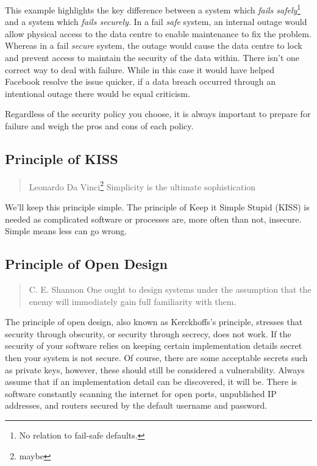 This example highlights the key difference between a system which \textsl{fails safely}\footnote{No relation to fail-safe defaults.} and a system which \textsl{fails securely}.
In a fail \textsl{safe} system, an internal outage would allow physical access to the data centre to enable maintenance to fix the problem.
Whereas in a fail \textsl{secure} system, the outage would cause the data centre to lock and prevent access to maintain the security of the data within.
There isn't one correct way to deal with failure.
While in this case it would have helped Facebook resolve the issue quicker,
if a data breach occurred through an intentional outage there would be equal criticism.

Regardless of the security policy you choose, it is always important to prepare for failure and weigh the pros and cons of each policy.

\subsection{Principle of KISS}

\begin{quote}{Leonardo Da Vinci\footnote{maybe}}
Simplicity is the ultimate sophistication
\end{quote}

\noindent We'll keep this principle simple.
The principle of Keep it Simple Stupid (KISS) is needed as complicated software or processes are, more often than not, insecure.
Simple means less can go wrong.

\subsection{Principle of Open Design}

\begin{quote}{C. E. Shannon \cite{shannons-maxim}}
One ought to design systems under the assumption that the enemy will immediately gain full familiarity with them.
\end{quote}

\noindent The principle of open design, also known as Kerckhoffs's principle,
stresses that security through obscurity, or security through secrecy, does not work.
If the security of your software relies on keeping certain implementation details secret then your system is not secure.
Of course, there are some acceptable secrets such as private keys, however, these should still be considered a vulnerability.
Always assume that if an implementation detail can be discovered, it will be.
There is software constantly scanning the internet for open ports, unpublished IP addresses,
and routers secured by the default username and password.

